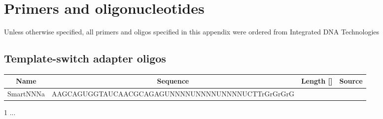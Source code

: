 \chapter{Primers and oligonucleotides}
\label{app:oligos}

Unless otherwise specified, all primers and oligos specified in this appendix were ordered from Integrated DNA Technologies %

\section{Template-switch adapter oligos}
\label{app:oligos_tsa}

\begin{threeparttable}
\begin{tabular}{cccc}\toprule
\textbf{Name} & \textbf{Sequence} & \textbf{Length [\nt{}]} & \textbf{Source} \\\midrule
SmartNNNa & AAGCAGUGGTAUCAACGCAGAGUNNNNUNNNNUNNNNUCTTrGrGrGrG & & \\
\bottomrule \end{tabular}
\begin{tablenotes}
\item[1] ...
\end{tablenotes}
\end{threeparttable}
